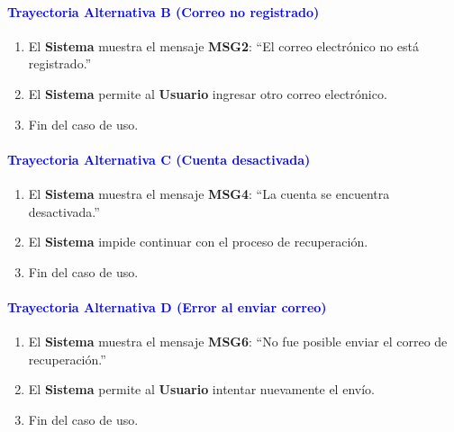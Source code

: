 \paragraph{\textbf{\textcolor{blue}{Trayectoria Alternativa B (Correo no registrado)}}}
\begin{enumerate}
    \item El \textbf{Sistema} muestra el mensaje \textbf{MSG2}: ``El correo electrónico no está registrado.''
    \item El \textbf{Sistema} permite al \textbf{Usuario} ingresar otro correo electrónico.
    \item Fin del caso de uso.
\end{enumerate}

\paragraph{\textbf{\textcolor{blue}{Trayectoria Alternativa C (Cuenta desactivada)}}}
\begin{enumerate}
    \item El \textbf{Sistema} muestra el mensaje \textbf{MSG4}: ``La cuenta se encuentra desactivada.''
    \item El \textbf{Sistema} impide continuar con el proceso de recuperación.
    \item Fin del caso de uso.
\end{enumerate}

\paragraph{\textbf{\textcolor{blue}{Trayectoria Alternativa D (Error al enviar correo)}}}
\begin{enumerate}
    \item El \textbf{Sistema} muestra el mensaje \textbf{MSG6}: ``No fue posible enviar el correo de recuperación.''
    \item El \textbf{Sistema} permite al \textbf{Usuario} intentar nuevamente el envío.
    \item Fin del caso de uso.
\end{enumerate}


